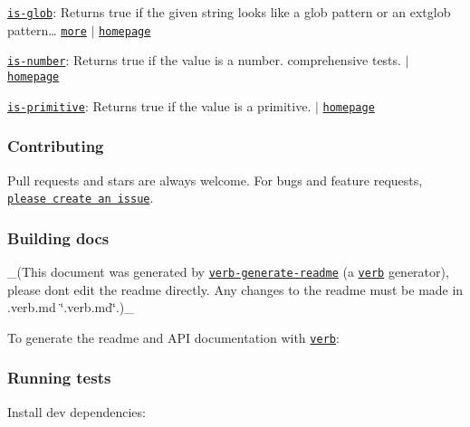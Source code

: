 \begin{DoxyItemize}
\item \href{https://www.npmjs.com/package/is-glob}{\tt is-\/glob}\+: Returns {\ttfamily true} if the given string looks like a glob pattern or an extglob pattern… \href{https://github.com/jonschlinkert/is-glob}{\tt more} $\vert$ \href{https://github.com/jonschlinkert/is-glob}{\tt homepage}
\item \href{https://www.npmjs.com/package/is-number}{\tt is-\/number}\+: Returns true if the value is a number. comprehensive tests. $\vert$ \href{https://github.com/jonschlinkert/is-number}{\tt homepage}
\item \href{https://www.npmjs.com/package/is-primitive}{\tt is-\/primitive}\+: Returns {\ttfamily true} if the value is a primitive. $\vert$ \href{https://github.com/jonschlinkert/is-primitive}{\tt homepage}
\end{DoxyItemize}

\subsubsection*{Contributing}

Pull requests and stars are always welcome. For bugs and feature requests, \href{../../issues/new}{\tt please create an issue}.

\subsubsection*{Building docs}

\+\_\+(This document was generated by \href{https://github.com/verbose/verb-generate-readme}{\tt verb-\/generate-\/readme} (a \href{https://github.com/verbose/verb}{\tt verb} generator), please don\textquotesingle{}t edit the readme directly. Any changes to the readme must be made in .verb.\+md \char`\"{}.\+verb.\+md\char`\"{}.)\+\_\+

To generate the readme and A\+PI documentation with \href{https://github.com/verbose/verb}{\tt verb}\+:




\subsubsection*{Running tests}

Install dev dependencies\+:


